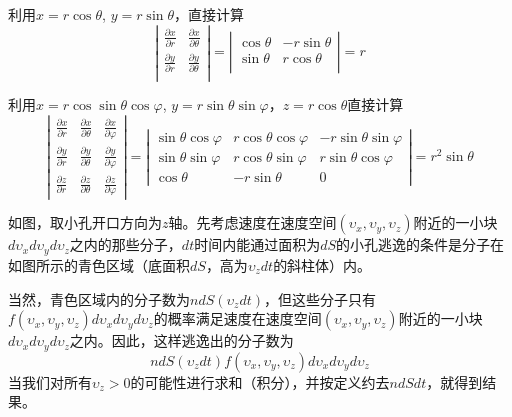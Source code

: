\documentclass[CJK]{beamer}
\begin{document}
\begin{frame}
\bch
利用$x=r\cos\theta$, $y=r\sin\theta$，直接计算
$$
\left\vert
\begin{array}{ll}
  \frac{\partial x}{\partial r}   &   \frac{\partial x}{\partial \theta} \\
  \frac{\partial y}{\partial r}   &   \frac{\partial y}{\partial \theta} \\
\end{array}
\right\vert
 = 
\left\vert
\begin{array}{ll}
  \cos\theta   &   -r\sin\theta \\
  \sin\theta   &   r\cos\theta \\
\end{array}
\right\vert
=r $$
\ech
\end{frame}

\begin{frame}
\bch
利用$x=r\cos\sin\theta\cos\varphi$, $y=r\sin\theta\sin\varphi$，$z=r\cos\theta$直接计算
$$
\left\vert
\begin{array}{lll}
  \frac{\partial x}{\partial r}   &   \frac{\partial x}{\partial \theta}  &   \frac{\partial x}{\partial \varphi} \\
  \frac{\partial y}{\partial r}   &   \frac{\partial y}{\partial \theta}  &   \frac{\partial y}{\partial \varphi} \\
  \frac{\partial z}{\partial r}   &   \frac{\partial z}{\partial \theta}  &   \frac{\partial z}{\partial \varphi} 
\end{array}
\right\vert
 = 
\left\vert
\begin{array}{lll}
  \sin\theta\cos\varphi   &   r\cos\theta\cos\varphi & -r\sin\theta\sin\varphi  \\
  \sin\theta\sin\varphi   &   r\cos\theta\sin\varphi & r\sin\theta\cos\varphi  \\
  \cos\theta   &   -r\sin\theta &  0 
\end{array}
\right\vert
= r^2\sin\theta $$
\ech
\end{frame}


\begin{frame}
\bch
{}
\emini
{}
{\small 如图，取小孔开口方向为$z$轴。先考虑速度在速度空间$(\upsilon_x,\upsilon_y,\upsilon_z)$附近的一小块$d\upsilon_xd\upsilon_yd\upsilon_z$之内的那些分子，$dt$时间内能通过面积为$dS$的小孔逃逸的条件是分子在如图所示的青色区域（底面积$dS$，高为$\upsilon_z dt$的斜柱体）内。}
\emini

当然，青色区域内的分子数为$n dS (\upsilon_z dt)$，但这些分子只有$f(\upsilon_x,\upsilon_y,\upsilon_z)d\upsilon_xd\upsilon_yd\upsilon_z$的概率满足速度在速度空间$(\upsilon_x,\upsilon_y,\upsilon_z)$附近的一小块$d\upsilon_xd\upsilon_yd\upsilon_z$之内。因此，这样逃逸出的分子数为
$$n dS (\upsilon_z dt) f(\upsilon_x,\upsilon_y,\upsilon_z)d\upsilon_xd\upsilon_yd\upsilon_z $$
当我们对所有$\upsilon_z>0$的可能性进行求和（积分），并按定义约去$n dS dt$，就得到结果。
\ech
\end{frame}
\end{document}
